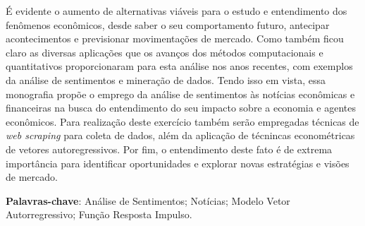 \begin{resumo}

É evidente o aumento de alternativas viáveis para o estudo e entendimento dos fenômenos econômicos, desde saber o seu comportamento futuro, antecipar acontecimentos e previsionar movimentações de mercado. Como também ficou claro as diversas aplicações que os avanços dos métodos computacionais e quantitativos proporcionaram para esta análise nos anos recentes, com exemplos da análise de sentimentos e mineração de dados. Tendo isso em vista, essa monografia propõe o emprego da análise de sentimentos às notícias econômicas e financeiras na busca do entendimento do seu impacto sobre a economia e agentes econômicos. Para realização deste exercício também serão empregadas técnicas de \textit{web scraping} para coleta de dados, além da aplicação de técnincas econométricas de vetores autoregressivos. Por fim, o entendimento deste fato é de extrema importância para identificar oportunidades e explorar novas estratégias e visões de mercado.


\textbf{Palavras-chave}: Análise de Sentimentos; Notícias; Modelo Vetor Autorregressivo; Função Resposta Impulso.

\end{resumo}
